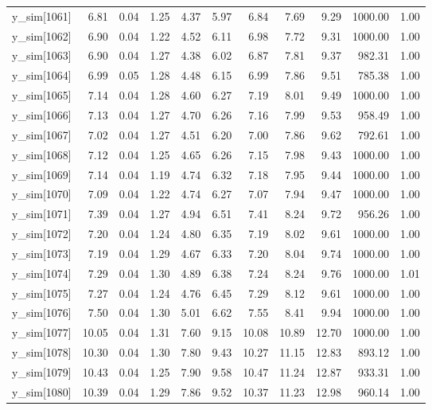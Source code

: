 \begin{table}[ht]
\begin{tabular}{rrrrrrrrrrr}
  y\_sim[1061] & 6.81 & 0.04 & 1.25 & 4.37 & 5.97 & 6.84 & 7.69 & 9.29 & 1000.00 & 1.00 \\ 
  y\_sim[1062] & 6.90 & 0.04 & 1.22 & 4.52 & 6.11 & 6.98 & 7.72 & 9.31 & 1000.00 & 1.00 \\ 
  y\_sim[1063] & 6.90 & 0.04 & 1.27 & 4.38 & 6.02 & 6.87 & 7.81 & 9.37 & 982.31 & 1.00 \\ 
  y\_sim[1064] & 6.99 & 0.05 & 1.28 & 4.48 & 6.15 & 6.99 & 7.86 & 9.51 & 785.38 & 1.00 \\ 
  y\_sim[1065] & 7.14 & 0.04 & 1.28 & 4.60 & 6.27 & 7.19 & 8.01 & 9.49 & 1000.00 & 1.00 \\ 
  y\_sim[1066] & 7.13 & 0.04 & 1.27 & 4.70 & 6.26 & 7.16 & 7.99 & 9.53 & 958.49 & 1.00 \\ 
  y\_sim[1067] & 7.02 & 0.04 & 1.27 & 4.51 & 6.20 & 7.00 & 7.86 & 9.62 & 792.61 & 1.00 \\ 
  y\_sim[1068] & 7.12 & 0.04 & 1.25 & 4.65 & 6.26 & 7.15 & 7.98 & 9.43 & 1000.00 & 1.00 \\ 
  y\_sim[1069] & 7.14 & 0.04 & 1.19 & 4.74 & 6.32 & 7.18 & 7.95 & 9.44 & 1000.00 & 1.00 \\ 
  y\_sim[1070] & 7.09 & 0.04 & 1.22 & 4.74 & 6.27 & 7.07 & 7.94 & 9.47 & 1000.00 & 1.00 \\ 
  y\_sim[1071] & 7.39 & 0.04 & 1.27 & 4.94 & 6.51 & 7.41 & 8.24 & 9.72 & 956.26 & 1.00 \\ 
  y\_sim[1072] & 7.20 & 0.04 & 1.24 & 4.80 & 6.35 & 7.19 & 8.02 & 9.61 & 1000.00 & 1.00 \\ 
  y\_sim[1073] & 7.19 & 0.04 & 1.29 & 4.67 & 6.33 & 7.20 & 8.04 & 9.74 & 1000.00 & 1.00 \\ 
  y\_sim[1074] & 7.29 & 0.04 & 1.30 & 4.89 & 6.38 & 7.24 & 8.24 & 9.76 & 1000.00 & 1.01 \\ 
  y\_sim[1075] & 7.27 & 0.04 & 1.24 & 4.76 & 6.45 & 7.29 & 8.12 & 9.61 & 1000.00 & 1.00 \\ 
  y\_sim[1076] & 7.50 & 0.04 & 1.30 & 5.01 & 6.62 & 7.55 & 8.41 & 9.94 & 1000.00 & 1.00 \\ 
  y\_sim[1077] & 10.05 & 0.04 & 1.31 & 7.60 & 9.15 & 10.08 & 10.89 & 12.70 & 1000.00 & 1.00 \\ 
  y\_sim[1078] & 10.30 & 0.04 & 1.30 & 7.80 & 9.43 & 10.27 & 11.15 & 12.83 & 893.12 & 1.00 \\ 
  y\_sim[1079] & 10.43 & 0.04 & 1.25 & 7.90 & 9.58 & 10.47 & 11.24 & 12.87 & 933.31 & 1.00 \\ 
  y\_sim[1080] & 10.39 & 0.04 & 1.29 & 7.86 & 9.52 & 10.37 & 11.23 & 12.98 & 960.14 & 1.00 \\ 

\end{tabular}
\end{table}
